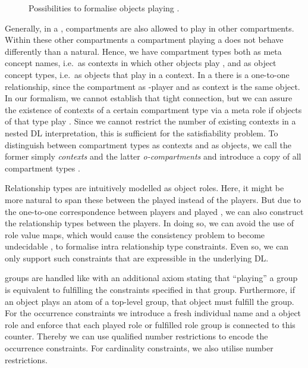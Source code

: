 \begin{figure}
  \centering
  \caption{Possibilities to formalise objects playing \rosiroles.}
  \label{fig:two-ways-to-play-roles}
\end{figure}

Generally, in a \SCROM, compartments are also allowed to play \rosiroles in other
compartments. Within these other compartments a compartment playing a \rosirole does not behave
differently than a natural. Hence, we have compartment types both as meta concept names, i.e.\ as
contexts in which other objects play \rosiroles, and as object concept types, i.e.\ as objects that
play \rosiroles in a context. In a \SCROM there is a one-to-one relationship, since the compartment
as \rosirole-player and as context is the same object. In our formalism, we cannot establish that
tight connection, but we can assure the existence of contexts of a certain compartment type via a
meta role \nested if objects of that type play \rosiroles. Since we cannot restrict the number of
existing contexts in a nested DL interpretation, this is sufficient for the satisfiability
problem. To distinguish between compartment types as contexts and as objects, we call the former
simply \emph{contexts} and the latter \emph{o-compartments} and introduce a copy \CT* of all
compartment types \CT.

Relationship types are intuitively modelled as object roles. Here, it might be more natural to span these
between the played \rosiroles instead of the players. But due to the one-to-one correspondence
between players and played \rosiroles, we can also construct the relationship types between the
players. In doing so, we can avoid the use of role value maps, which would cause the consistency
problem to become undecidable \cite{Sch89}, to formalise intra relationship type constraints. Even so, we
can only support such constraints that are expressible in the underlying DL.

\Rosirole groups are handled like \rosiroles with an additional axiom stating that ``playing'' a
\rosirole group is equivalent to fulfilling the constraints specified in that \rosirole
group. Furthermore, if an object plays an atom of a top-level \rosirole group, that object must
fulfill the \rosirole group.
%
For the occurrence constraints we introduce a fresh individual name \occurCounter and a object role
\counts and enforce that each played role or fulfilled role group is connected to this
counter. Thereby we can use qualified number restrictions to encode the occurrence constraints.
%
For cardinality constraints, we also utilise number restrictions.

